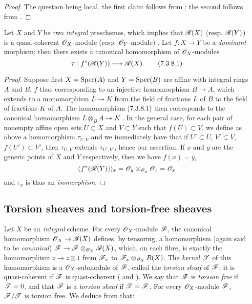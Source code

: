 \begin{proof}
\label{proof-1.7.3.7}
The question being local, the first claim follows from ; the second follows from .
\end{proof}

\begin{env}[7.3.8]
\label{1.7.3.8}
Let $X$ and $Y$ be two \emph{integral} preschemes, which implies that $\mathscr{R}(X)$ (resp. $\mathscr{R}(Y)$) is a quasi-coherent $\mathscr{O}_X$-module (resp. $\mathscr{O}_Y$-module) .
Let $f:X\to Y$ be a \emph{dominant} morphism; then there exists a canonical homomorphism of $\mathscr{O}_X$-modules
\[
  \tau:f^*(\sh{R}(Y))\to\sh{R}(X).
  \tag{7.3.8.1}
\]
\end{env}

\begin{proof}
\label{proof-1.7.3.8}
Suppose first $X={\mathop{\mathrm{Spec}}\nolimits}(A)$ and $Y={\mathop{\mathrm{Spec}}\nolimits}(B)$ are affine with integral rings $A$ and $B$, $f$ thus corresponding to an injective homomorphism $B\to A$, which extends to a monomorphism $L\to K$ from the field of fractions $L$ of $B$ to the field of fractions $K$ of $A$.
The homomorphism (7.3.8.1) then corresponds to the canonical homomorphism $L\otimes_B A\to K$ .
In the general case, for each pair of nonempty affine open sets $U\subset X$ and $V\subset Y$ such that $f(U)\subset V$, we define as above a homomorphism $\tau_{U,V}$ and we immediately have that if $U'\subset U$, $V'\subset V$, $f(U')\subset V'$, then $\tau_{U,V}$ extends $\tau_{U',V'}$, hence our assertion.
If $x$ and $y$ are the generic points of $X$ and $Y$ respectively, then we have $f(x)=y$,
\[
  (f^*(\mathscr{R}(Y)))_x=\mathscr{O}_y\otimes_{\mathscr{O}_y}\mathscr{O}_x=\mathscr{O}_x
\]
 and $\tau_x$ is thus an \emph{isomorphism}.
\end{proof}

\subsection{Torsion sheaves and torsion-free sheaves}
\label{subsection:torsion-sheaves-and-torsion-free-sheaves}

\begin{env}[7.4.1]
\label{1.7.4.1}
Let $X$ be an \emph{integral} scheme.
For every $\mathscr{O}_X$-module $\mathscr{F}$, the canonical homomorphism $\OO_X\to\sh{R}(X)$ defines, by tensoring, a homomorphism (again said to be \emph{canonical}) $\sh{F}\to\sh{F}\otimes_{\OO_X}\sh{R}(X)$, which, on each fibre, is exactly the homomorphism $z\to z\otimes1$ from $\mathscr{F}_x$ to $\mathscr{F}_x\otimes_{\mathscr{O}_X}R(X)$.
The \emph{kernel $\mathscr{T}$} of this homomorphism is a $\mathscr{O}_X$-submodule of $\mathscr{F}$, called the \emph{torsion sheaf} of $\mathscr{F}$; it is quasi-coherent if $\mathscr{F}$ is quasi-coherent ( and ).
We say that $\mathscr{F}$ is \emph{torsion free} if $\mathscr{T}=0$, and that $\mathscr{F}$ is a \emph{torsion sheaf} if $\mathscr{T}=\mathscr{F}$.
For every $\mathscr{O}_X$-module $\mathscr{F}$, $\mathscr{F}/\mathscr{T}$ is torsion free.
We deduce from  that:
\end{env}

